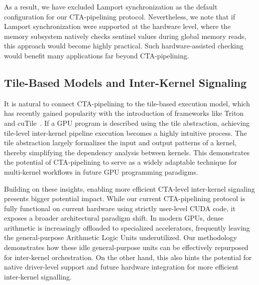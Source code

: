 As a result, we have excluded Lamport synchronization as the default configuration for our CTA-pipelining protocol. Nevertheless, we note that if Lamport synchronization were supported at the hardware level, where the memory subsystem natively checks sentinel values during global memory reads, this approach would become highly practical. Such hardware-assisted checking would benefit many applications far beyond CTA-pipelining.

\subsection{Tile-Based Models and Inter-Kernel Signaling}

It is natural to connect CTA-pipelining to the tile-based execution model, which has recently gained popularity with the introduction of frameworks like Triton~\cite{tillet2019triton} and cuTile~\cite{cutile}. If a GPU program is described using the tile abstraction, achieving tile-level inter-kernel pipeline execution becomes a highly intuitive process. The tile abstraction largely formalizes the input and output patterns of a kernel, thereby simplifying the dependency analysis between kernels. This demonstrates the potential of CTA-pipelining to serve as a widely adaptable technique for multi-kernel workflows in future GPU programming paradigms.

Building on these insights, enabling more efficient CTA-level inter-kernel signaling presents bigger potential impact. While our current CTA-pipelining protocol is fully functional on current hardware using strictly user-level CUDA code, it exposes a broader architectural paradigm shift. In modern GPUs, dense arithmetic is increasingly offloaded to specialized accelerators, frequently leaving the general-purpose Arithmetic Logic Units underutilized. Our methodology demonstrates how these idle general-purpose units can be effectively repurposed for inter-kernel orchestration. On the other hand, this also hints the potential for native driver-level support and future hardware integration for more efficient inter-kernel signalling.



